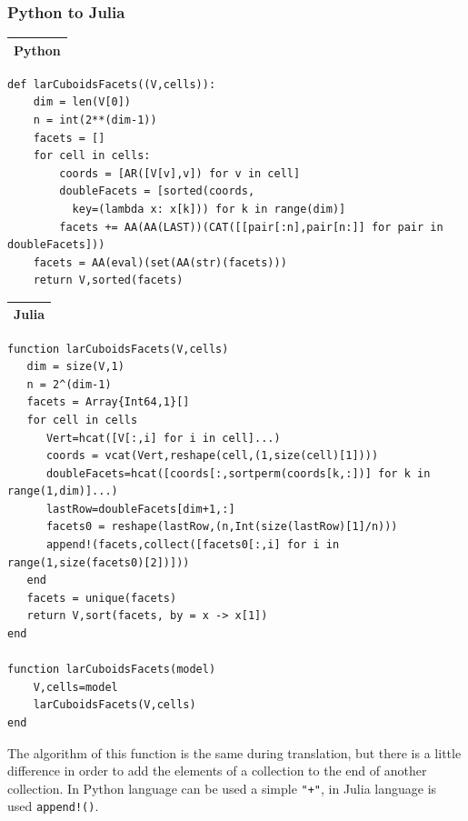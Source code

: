 \documentclass{article}
\begin{document}
\begin{flushleft} \small
\subsubsection{Python to Julia}
\vspace{1ex}
\begin{center}
\begin{tabular}{|p{16cm}|}
\hline
\cellcolor[gray]{.9}Python\\
\hline
\end{tabular}
\end{center}
\vspace{2ex}
\begin{list}{}{} \item
\begin{Verbatim}[tabsize=3]
def larCuboidsFacets((V,cells)):
	dim = len(V[0])
	n = int(2**(dim-1))
	facets = []
	for cell in cells:
		coords = [AR([V[v],v]) for v in cell] 
		doubleFacets = [sorted(coords,
		  key=(lambda x: x[k])) for k in range(dim)] 
		facets += AA(AA(LAST))(CAT([[pair[:n],pair[n:]] for pair in doubleFacets]))
	facets = AA(eval)(set(AA(str)(facets))) 
	return V,sorted(facets)
\end{Verbatim}
\end{list}
\vspace{2ex}
\begin{center}
\begin{tabular}{|p{16cm}|}
\hline
\cellcolor[gray]{.9}Julia\\
\hline
\end{tabular}
\end{center}
\vspace{2ex}
\begin{list}{}{} \item
\begin{Verbatim}[tabsize=3]
function larCuboidsFacets(V,cells)
   dim = size(V,1)
   n = 2^(dim-1)
   facets = Array{Int64,1}[]
   for cell in cells
      Vert=hcat([V[:,i] for i in cell]...)
      coords = vcat(Vert,reshape(cell,(1,size(cell)[1])))
      doubleFacets=hcat([coords[:,sortperm(coords[k,:])] for k in range(1,dim)]...)
      lastRow=doubleFacets[dim+1,:]
      facets0 = reshape(lastRow,(n,Int(size(lastRow)[1]/n)))
      append!(facets,collect([facets0[:,i] for i in range(1,size(facets0)[2])]))
   end
   facets = unique(facets)
   return V,sort(facets, by = x -> x[1])
end

function larCuboidsFacets(model)
    V,cells=model
    larCuboidsFacets(V,cells)
end
  \end{Verbatim}
\end{list}

\end{flushleft}
\vspace{2ex}
The algorithm of this function is the same during translation, but there is a little difference in order to add the elements of a collection to the end of another collection. In Python language can be used a simple \texttt{"+"}, in Julia language is used \texttt{append!()}. 
\end{document}
